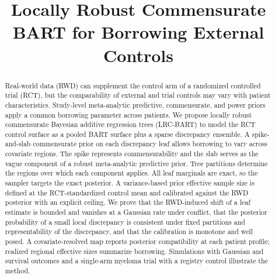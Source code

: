 %

\providecommand{\SIMRESULT}[1]{\textbf{[SIM:\ #1]}}

\title{Locally Robust Commensurate BART for Borrowing External Controls}
\author{}
\date{}
\maketitle

\begin{abstract}
Real-world data (RWD) can supplement the control arm of a randomized controlled trial (RCT), but the comparability of external and trial controls may vary with patient characteristics. Study-level meta-analytic predictive, commensurate, and power priors apply a common borrowing parameter across patients. We propose locally robust commensurate Bayesian additive regression trees (LRC-BART) to model the RCT control surface as a pooled BART surface plus a sparse discrepancy ensemble. A spike-and-slab commensurate prior on each discrepancy leaf allows borrowing to vary across covariate regions. The spike represents commensurability and the slab serves as the vague component of a robust meta-analytic predictive prior. Tree partitions determine the regions over which each component applies. All leaf marginals are exact, so the sampler targets the exact posterior. A variance-based prior effective sample size is defined at the RCT-standardized control mean and calibrated against the RWD posterior with an explicit ceiling. We prove that the RWD-induced shift of a leaf estimate is bounded and vanishes at a Gaussian rate under conflict, that the posterior probability of a small local discrepancy is consistent under fixed partitions and representability of the discrepancy, and that the calibration is monotone and well posed. A covariate-resolved map reports posterior compatibility at each patient profile; realized regional effective sizes summarize borrowing. Simulations with Gaussian and survival outcomes and a single-arm myeloma trial with a registry control illustrate the method.
\end{abstract}

